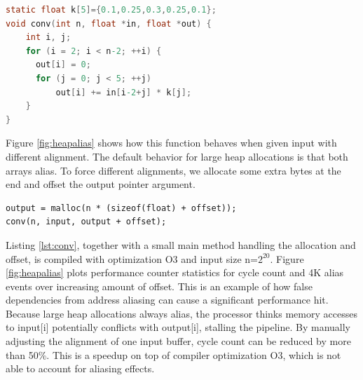 \documentclass[a4paper,10pt,twocolumn,twoside]{article}
\begin{document}
\begin{lstlisting}[float=t, language=C, caption={Naive implementation of convolution. Highly sensitive to aliasing between input and output arrays.}, label={lst:conv}, frame=lines]
static float k[5]={0.1,0.25,0.3,0.25,0.1};
void conv(int n, float *in, float *out) {
    int i, j;
    for (i = 2; i < n-2; ++i) {
      out[i] = 0;
      for (j = 0; j < 5; ++j)
          out[i] += in[i-2+j] * k[j];
    }
}
\end{lstlisting}

Figure \ref{fig:heapalias} shows how this function behaves when given input with different alignment.
The default behavior for large heap allocations is that both arrays alias.
To force different alignments, we allocate some extra bytes at the end and offset the output pointer argument.

\begin{lstlisting}
output = malloc(n * (sizeof(float) + offset));
conv(n, input, output + offset);
\end{lstlisting}

Listing \ref{lst:conv}, together with a small main method handling the allocation and offset, is compiled with optimization O3 and input size n=$2^{20}$.
Figure \ref{fig:heapalias} plots performance counter statistics for cycle count and 4K alias events over increasing amount of offset.
This is an example of how false dependencies from address aliasing can cause a significant performance hit.
Because large heap allocations always alias, the processor thinks memory accesses to input[i] potentially conflicts with output[i], stalling the pipeline.
By manually adjusting the alignment of one input buffer, cycle count can be reduced by more than 50\%.
This is a speedup on top of compiler optimization O3, which is not able to account for aliasing effects.


\pgfplotstabletranspose[
  col sep=comma,
  columns={n, cycles:u,r0107:u,r02a3:u,r01a2:u,r05a3:u,r04a2:u,r20a1:u,r0860:u,r0160:u,r2049:u,r6049:u},
  colnames from=n %
  ]
\end{document}
